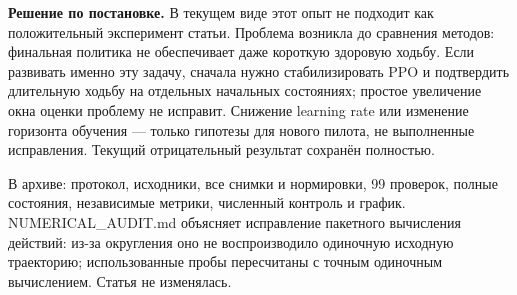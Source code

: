 \documentclass[10pt,a4paper]{article}
\begin{document}
\textbf{Решение по постановке.} В текущем виде этот опыт не подходит как положительный эксперимент статьи. Проблема возникла до сравнения методов: финальная политика не обеспечивает даже короткую здоровую ходьбу. Если развивать именно эту задачу, сначала нужно стабилизировать PPO и подтвердить длительную ходьбу на отдельных начальных состояниях; простое увеличение окна оценки проблему не исправит. Снижение learning rate или изменение горизонта обучения --- только гипотезы для нового пилота, не выполненные исправления. Текущий отрицательный результат сохранён полностью.

В архиве: протокол, исходники, все снимки и нормировки, 99 проверок, полные состояния, независимые метрики, численный контроль и график. NUMERICAL\_AUDIT.md объясняет исправление пакетного вычисления действий: из-за округления оно не воспроизводило одиночную исходную траекторию; использованные пробы пересчитаны с точным одиночным вычислением. Статья не изменялась.
\end{document}
